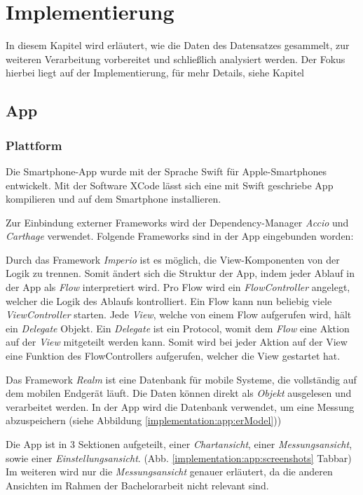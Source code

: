 \chapter{Implementierung}
\label{ch:Implementierung}

In diesem Kapitel wird erläutert, wie die Daten des Datensatzes gesammelt, zur weiteren Verarbeitung vorbereitet und schließlich analysiert werden.
Der Fokus hierbei liegt auf der Implementierung, für mehr Details, siehe Kapitel  %

\section{App}
\subsection{Plattform}
Die Smartphone-App wurde mit der Sprache Swift für Apple-Smartphones entwickelt. 
Mit der Software XCode lässt sich eine mit Swift geschriebe App kompilieren und auf dem Smartphone installieren.

Zur Einbindung externer Frameworks wird der Dependency-Manager \textit{Accio} und \textit{Carthage} verwendet.
Folgende Frameworks sind in der App eingebunden worden:

Durch das Framework \textit{Imperio} ist es möglich, die View-Komponenten von der Logik zu trennen. 
Somit ändert sich die Struktur der App, indem jeder Ablauf in der App als \textit{Flow} interpretiert wird. 
Pro Flow wird ein \textit{FlowController} angelegt, welcher die Logik des Ablaufs kontrolliert. 
Ein Flow kann nun beliebig viele \textit{ViewController} starten.
Jede \textit{View}, welche von einem Flow aufgerufen wird, hält ein \textit{Delegate} Objekt.
Ein \textit{Delegate} ist ein Protocol, womit dem \textit{Flow} eine Aktion auf der \textit{View} mitgeteilt werden kann.
Somit wird bei jeder Aktion auf der View eine Funktion des FlowControllers aufgerufen, welcher die View gestartet hat.


Das Framework \textit{Realm} ist eine Datenbank für mobile Systeme, die vollständig auf dem mobilen Endgerät läuft.
Die Daten können direkt als \textit{Objekt} ausgelesen und verarbeitet werden.
In der App wird die Datenbank verwendet, um eine Messung abzuspeichern (siehe Abbildung \ref{implementation:app:erModel}))

Die App ist in 3 Sektionen aufgeteilt, einer \textit{Chartansicht}, einer \textit{Messungsansicht}, sowie einer \textit{Einstellungsansicht}. 
(Abb. \ref{implementation:app:screenshots} Tabbar)
Im weiteren wird nur die \textit{Messungsansicht} genauer erläutert, da die anderen Ansichten im Rahmen der Bachelorarbeit nicht relevant sind.

